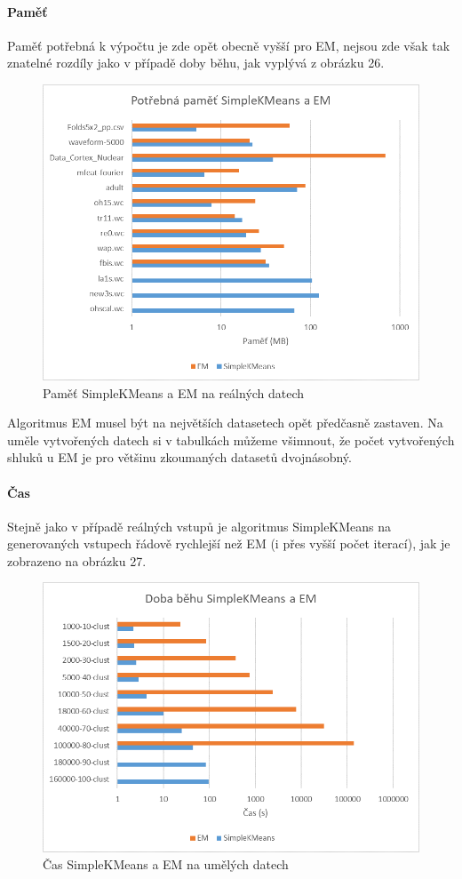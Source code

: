 \documentclass[12pt]{article}
\begin{document}
\paragraph{Paměť}
Paměť potřebná k výpočtu je zde opět obecně vyšší pro EM, nejsou zde však tak znatelné rozdíly jako v případě doby běhu, jak vyplývá z obrázku 26.
\begin{figure}[hbp]
  \centering
  \includegraphics[scale=1]{img/realclustmem.png}
  \caption{Paměť SimpleKMeans a EM na reálných datech}
\end{figure}

\newpage
{}
Algoritmus EM musel být na největších datasetech opět předčasně zastaven. Na uměle vytvořených datech si v tabulkách můžeme všimnout, že počet vytvořených shluků u EM je pro většinu zkoumaných datasetů dvojnásobný.
\paragraph{Čas}
Stejně jako v případě reálných vstupů je algoritmus SimpleKMeans na generovaných vstupech řádově rychlejší než EM (i přes vyšší počet iterací), jak je zobrazeno na obrázku 27. 
\begin{figure}[hbp]
  \centering
  \includegraphics[scale=1]{img/genclusttime.png}
  \caption{Čas SimpleKMeans a EM na umělých datech}
\end{figure}
\end{document}
